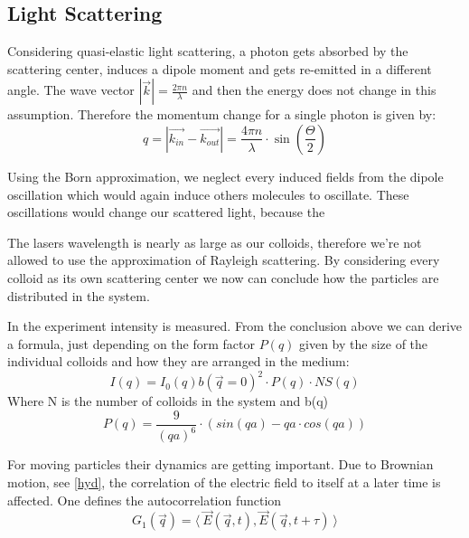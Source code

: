 \documentclass[]{article}
\begin{document}
\subsection{Light Scattering}
Considering quasi-elastic light scattering, a photon gets absorbed by the scattering center, induces a dipole moment and gets re-emitted in a different angle. The wave vector $ |\vec{k}| = \frac{2\pi n}{\lambda}$ and then the energy does not change in this assumption. Therefore the momentum change for a single photon is given by:
\begin{equation}\label{eq:momentum}
q= |\vec{k_{in}} - \vec{k_{out}}| = \frac{4\pi n}{\lambda} \cdot \sin \left( \dfrac{\Theta}{2} \right)  
\end{equation}


Using the Born approximation, we neglect every induced fields from the dipole oscillation which would again induce others molecules to oscillate. These oscillations would change our scattered light, because the  

	
The lasers wavelength is nearly as large as our colloids, therefore we're not allowed to use the approximation of Rayleigh scattering. By considering every colloid as its own scattering center we now can conclude how the particles are distributed in the system.

In the experiment intensity is measured. From the conclusion above we can derive a formula, just depending on the form factor $P(q)$ given by the size of the individual colloids and how they are arranged in the medium:
\begin{equation} \label{eq:intensity}
I(q) = I_0(q)b(\vec{q}=0)^2 \cdot P(q) \cdot NS(q)
\end{equation}
Where N is the number of colloids in the system and b(q) 
\\

\begin{equation}\label{eq:form}
P(q)= \frac{9}{(qa)^6} \cdot (sin(qa) - qa \cdot cos(qa))
\end{equation}


For moving particles their dynamics are getting important. Due to Brownian motion, see \ref{hyd}, the correlation of the electric field to itself at a later time is affected. One defines the autocorrelation function 
\begin{equation}\label{eq:g1}
G_1(\vec{q}) = \langle \: \vec{E}(\vec{q},t),\vec{E}(\vec{q},t+\tau) \: \rangle
\end{equation}
\end{document}
